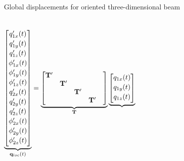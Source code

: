 \documentclass[aspectratio=169]{beamer}
\begin{document}
\begin{frame}{Global displacements for oriented three-dimensional beam}
  \vspace{-0.5cm}

  \begin{columns}
    \small $$\underbrace{ \begin{bmatrix}
          {\color{black} q_{1x}^\prime(t)}       \\[2pt]
          {\color{black} q_{1y}^\prime(t)}       \\[2pt]
          {\color{black} q_{1z}^\prime(t)}       \\[2pt]
          {\color{black} \phi_{1x}^\prime(t)}    \\[2pt]
          {\color{black} \phi_{1y}^\prime(t)   } \\[2pt]
          {\color{black} \phi_{1z}^\prime(t)}    \\[2pt]
          {\color{black} q_{2x}^\prime(t)}       \\[2pt]
          {\color{black} q_{2y}^\prime(t)}       \\[2pt]
          {\color{black} q_{2z}^\prime(t)}       \\[2pt]
          {\color{black} \phi_{2x}^\prime(t)}    \\[2pt]
          {\color{black} \phi_{2y}^\prime(t)   } \\[2pt]
          {\color{black} \phi_{2z}^\prime(t)}    \\[2pt]
        \end{bmatrix}}_\text{$\mathbf q_{loc} (t)$} = \underbrace{ \begin{bmatrix}
          \mathbf {T^\prime} &                    &                    &                    & \\
                             & \mathbf {T^\prime} &                    &                      \\
                             &                    & \mathbf {T^\prime} &                      \\
                             &                    &                    & \mathbf {T^\prime}   \\
        \end{bmatrix}}_\text{$\mathbf T$} \underbrace{ \begin{bmatrix}
          {\color{black} q_{1x}(t)}       \\[2pt]
          {\color{black} q_{1y}(t)}       \\[2pt]
          {\color{black} q_{1z}(t)}       \\[2pt]

\end{bmatrix}}$$
\end{columns}
\end{frame}
\end{document}
